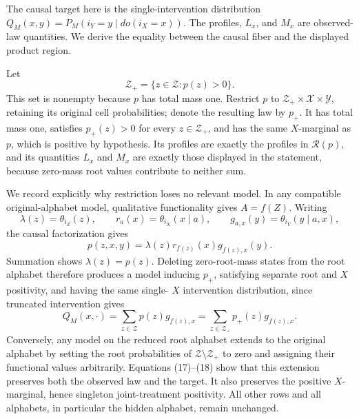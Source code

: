 The causal target here is the single-intervention distribution
\(Q_M(x,y)=P_M(i_Y=y\mid do(i_X=x))\).  The profiles, \(L_x\), and
\(M_x\) are observed-law quantities.  We derive the equality between the
causal fiber and the displayed product region.

Let
\[
 \mathcal Z_+=\{z\in\mathcal Z:p(z)>0\}.
\]
This set is nonempty because \(p\) has total mass one.  Restrict \(p\) to
\(\mathcal Z_+\times\mathcal X\times\mathcal Y\), retaining its original
cell probabilities; denote the resulting law by \(p_+\).  It has total
mass one, satisfies \(p_+(z)>0\) for every \(z\in\mathcal Z_+\), and has
the same \(X\)-marginal as \(p\), which is positive by hypothesis.  Its
profiles are exactly the profiles in \(\mathcal R(p)\), and its quantities
\(L_x\) and \(M_x\) are exactly those displayed in the statement, because
zero-mass root values contribute to neither sum.

We record explicitly why restriction loses no relevant model.  In any
compatible original-alphabet model, qualitative functionality gives
\(A=f(Z)\).  Writing
\[
 \lambda(z)=\theta_{i_Z}(z),\qquad
 r_a(x)=\theta_{i_X}(x\mid a),\qquad
 g_{a,x}(y)=\theta_{i_Y}(y\mid a,x),
\]
the causal factorization gives
\[
 p(z,x,y)=\lambda(z)r_{f(z)}(x)g_{f(z),x}(y).
\tag{17}
\]
Summation shows \(\lambda(z)=p(z)\).  Deleting zero-root-mass states from
the root alphabet therefore produces a model inducing \(p_+\), satisfying
separate root and \(X\) positivity, and having the same single-
\(X\) intervention distribution, since truncated intervention gives
\[
 Q_M(x,\cdot)=\sum_{z\in\mathcal Z}p(z)g_{f(z),x}
             =\sum_{z\in\mathcal Z_+}p_+(z)g_{f(z),x}.
\tag{18}
\]
Conversely, any model on the reduced root alphabet extends to the original
alphabet by setting the root probabilities of
\(\mathcal Z\setminus\mathcal Z_+\) to zero and assigning their functional
values arbitrarily.  Equations (17)--(18) show that this extension
preserves both the observed law and the target.  It also preserves the
positive \(X\)-marginal, hence singleton joint-treatment positivity.  All
other rows and all alphabets, in particular the hidden alphabet, remain
unchanged.

